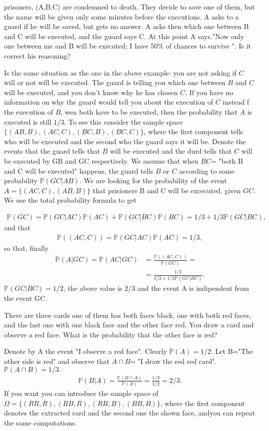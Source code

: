\documentclass[12pt]{article}
\newcommand{\<}{{\langle \!\! \langle}}
\renewcommand{\>}{{\rangle \!\! \rangle}}
\newcommand{\bel}[2]{\begin{equation} \label{#1} \begin{split} #2
 					\end{split} \end{equation}}
\begin{document}
\begin{ExerciseList}
	 prisoners, (A,B,C) are condemned to death. They decide to save one of them, but the name will be given only some minutes before the executions. A asks to a guard if he will be saved, but gets no answer. A asks then which one between B and C will be executed, and the guard says C. At this point A says."Now only one between me and B will be executed; I have 50\% of chances to survive ". Is it correct his reasoning?

	\Answer Is the same situation as the one in the above example: you are not asking if $C$ will or not will be executed. The guard is telling you which one between $B$ and $C$ will be executed, and you don't know why he has chosen $C$. If you have no information on why the guard would tell you  about the execution of $C$ instead f the execution of $B$, wen both have to be executed, then the probability that $A$ is executed is still $1/3$. 
	To see this consider the sample space$ \{(AB,B), (AC,C), (BC,B), (BC,C)\}$, where the first component tells who will be executed and the second who the guard says it will be. Denote the events that the guard tells that $B$ will be  executed and the durd tells that $C$ will be executed by GB and GC respectively. We assume that when $BC$= "both B and C will be executed" happens, the guard tells $B$ or $C$ according to some probability $\mathbb{P}(GC| AB)$. We are looking for the probability of the event $A=\{(AC,C), (AB,B)\}$ that prisioners B and C will be excecuted, given $GC$. We use the total probability formula to get 

	\bel{}{\mathbb{P}(GC)=\mathbb{P}(GC|AC)\mathbb{P}(AC)+\mathbb{P}(GC|BC)\mathbb{P}(BC)=1/3+1/3\mathbb{P}(GC|BC),}
and that
	\bel{}{\mathbb{P}((AC,C))=\mathbb{P}(GC|AC)\mathbb{P}(AC)=1/3,}
	so that, finally 
	\bel{}{\mathbb{P}(A|GC) = \mathbb{P}(AC|GC) & =\frac{\mathbb{P}((AC,C))}{\mathbb{P}(GC)} =  \\
	 & = \frac{1/3}{1/3+1/3\mathbb{P}(GC|BC)}.}
	$\mathbb{P}(GC|BC) =1/2 $, the above value is $2/3$ and the event A is indipendent from the event GC.

\Exercise There are three cards one of them has both faces black, one with both red faces, and the last one with one black face and the other face red. You draw a card and observe a red face. What is the probability that the other face is red? 

\Answer
	Denote by A  the event "I observe a red face". Clearly $\mathbb{P}(A)=1/2$. Let B="The other side is red" and observe that $A\cap B$= "I draw the red red card". $\mathbb{P} ( A\cap B) = 1/3.$
	\bel{}{\mathbb{P}(B|A)=\frac{\mathbb{P}( B \cap A)}{\mathbb{P}(A)}= \frac{1/3}{1/2}=2/3.}
	If you want you can introduce the sample space of $\Omega=\{(RR,R),(RB,R),(RB,B), (BB,B)\}$, where the first component denotes the extracted card and the second one the shown face, andyou can repeat the same computations. 

\end{ExerciseList}
\end{document}
